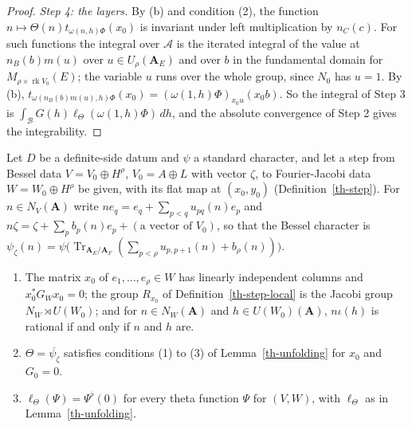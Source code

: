 \begin{proof}
\emph{Step 4: the layers.} By (b) and condition (2), the function
$n\mapsto\Theta(n)t_{\omega(n,h)\Phi}(x_0)$ is invariant under left
multiplication by $n_C(c)$. For such functions the integral over $\mathcal A$ is
the iterated integral of the value at $n_B(b)m(u)$ over $u\in U_\rho(\mathbf A_E)$
and over $b$ in the fundamental domain for $M_{\rho\times\operatorname{rk}V_0}(E)$;
the variable $u$ runs over the whole group, since $N_0$ has $u=1$. By (b),
$t_{\omega(n_B(b)m(u),h)\Phi}(x_0)=(\omega(1,h)\Phi)_{x_0u}(x_0b)$. So the
integral of Step 3 is $\int_{\mathcal B}G(h)\ell_\Theta(\omega(1,h)\Phi)\,dh$,
and the absolute convergence of Step 2 gives the integrability.
\end{proof}

\begin{lemma}\label{th-bessel-unfolding}
Let $D$ be a definite-side datum and $\psi$ a standard character, and let a
step from Bessel data $V=V_0\oplus H^\rho$, $V_0=A\oplus L$ with vector
$\zeta$, to Fourier-Jacobi data $W=W_0\oplus H^\rho$ be given, with its flat map
at $(x_0,y_0)$ (Definition~\ref{th-step}). For $n\in N_V(\mathbf A)$ write
$n e_q=e_q+\sum_{p<q}u_{pq}(n)e_p$ and $n\zeta=\zeta+\sum_pb_p(n)e_p+(\text{a vector of }V_0)$,
so that the Bessel character is
$\psi_\zeta(n)=\psi\bigl(\operatorname{Tr}_{\mathbf A_E/\mathbf A_F}(\sum_{p<\rho}u_{p,p+1}(n)+b_\rho(n))\bigr)$.
\begin{enumerate}
\item The matrix $x_0$ of $e_1,\ldots,e_\rho\in W$ has linearly independent columns
  and $x_0^*G_Wx_0=0$; the group $R_{x_0}$ of Definition~\ref{th-step-local} is
  the Jacobi group $N_W\rtimes U(W_0)$; and for $n\in N_W(\mathbf A)$ and
  $h\in U(W_0)(\mathbf A)$, $n\iota(h)$ is rational if and only if $n$ and $h$
  are.
\item $\Theta=\overline{\psi_\zeta}$ satisfies conditions (1) to (3) of
  Lemma~\ref{th-unfolding} for $x_0$ and $G_0=0$.
\item $\ell_\Theta(\Psi)=\Psi^\flat(0)$ for every theta function $\Psi$ for
  $(V,W)$, with $\ell_\Theta$ as in Lemma~\ref{th-unfolding}.
\end{enumerate}
\end{lemma}
